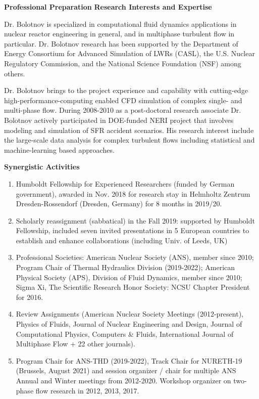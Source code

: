 \documentclass[11pt,letterpaper,english]{article}
\begin{document}
\begin{flushleft} {\bf Professional Preparation}
\vspace{-6pt}
{\bf Research Interests and Expertise}
{\parindent 16pt

Dr. Bolotnov is specialized in computational fluid dynamics applications in nuclear reactor engineering in general, and in multiphase turbulent flow in particular. Dr. Bolotnov research has been supported by the Department of Energy Consortium for Advanced Simulation of LWRs (CASL), the U.S. Nuclear Regulatory Commission, and the National Science Foundation (NSF) among others.

Dr. Bolotnov brings to the project experience and capability with cutting-edge high-performance-computing enabled CFD simulation of complex single- and multi-phase flow. During 2008-2010 as a post-doctoral research associate Dr. Bolotnov actively participated in DOE-funded NERI project that involves modeling and simulation of SFR accident scenarios. His research interest include the large-scale data analysis for complex turbulent flows including statistical and machine-learning based approaches.

}

\vspace{.04in}
{\bf Synergistic Activities}
\vspace{-6pt}
\begin{enumerate} \itemsep1pt \parskip0pt 
\item Humboldt Fellowship for Experienced Researchers (funded by German government), awarded in
Nov. 2018 for research stay in Helmholtz Zentrum Dresden-Rossendorf (Dresden, Germany) for
8 months in 2019/20. \\
\item Scholarly reassignment (sabbatical) in the Fall 2019: supported by Humboldt Fellowship, included seven invited presentations in 5 European countries to establish and enhance collaborations
(including Univ. of Leeds, UK) \\
\item Professional Societies: American Nuclear Society (ANS), member since 2010; Program Chair of
Thermal Hydraulics Division (2019-2022); American Physical Society (APS), Division of Fluid
Dynamics, member since 2010; Sigma Xi, The Scientific Research Honor Society: NCSU
Chapter President for 2016. \\
\item Review Assignments (American Nuclear Society Meetings (2012-present), Physics of Fluids,
Journal of Nuclear Engineering and Design, Journal of Computational Physics, Computers \&
Fluids, International Journal of Multiphase Flow + 22 other journals). \\
\item Program Chair for ANS-THD (2019-2022), Track Chair for NURETH-19 (Brussels, August 2021) and session organizer / chair for multiple ANS Annual and Winter meetings from 2012-2020. Workshop organizer on two-phase flow research
in 2012, 2013, 2017. \\
\end{enumerate}


\end{flushleft}
\end{document}
